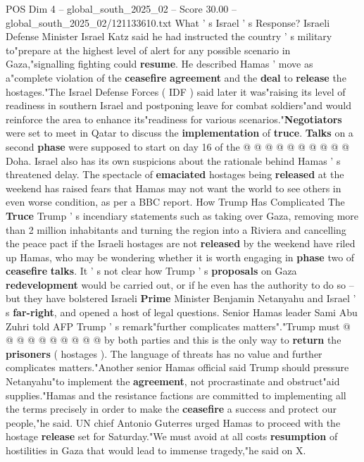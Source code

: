 \begin{textsample}{POS Dim 4 – global\_south\_2025\_02 – Score 30.00 – global\_south\_2025\_02/121133610.txt}
What ' s Israel ' s Response?
Israeli Defense Minister Israel Katz said he had instructed the country ' s military to"prepare at the highest level of alert for any possible scenario in Gaza,"signalling fighting could \textbf{resume}.
He described Hamas ' move as a"complete violation of the \textbf{ceasefire} \textbf{agreement} and the \textbf{deal} to \textbf{release} the hostages."The Israel Defense Forces ( IDF ) said later it was"raising its level of readiness in southern Israel and postponing leave for combat soldiers"and would reinforce the area to enhance its"readiness for various scenarios."\textbf{Negotiators} were set to meet in Qatar to discuss the \textbf{implementation} of \textbf{truce}. \textbf{Talks} on a second \textbf{phase} were supposed to start on day 16 of the @ @ @ @ @ @ @ @ @ @ Doha.
Israel also has its own suspicions about the rationale behind Hamas ' s threatened delay.
The spectacle of \textbf{emaciated} hostages being \textbf{released} at the weekend has raised fears that Hamas may not want the world to see others in even worse condition, as per a BBC report.
How Trump Has Complicated The \textbf{Truce} Trump ' s incendiary statements such as taking over Gaza, removing more than 2 million inhabitants and turning the region into a Riviera and cancelling the peace pact if the Israeli hostages are not \textbf{released} by the weekend have riled up Hamas, who may be wondering whether it is worth engaging in \textbf{phase} two of \textbf{ceasefire} \textbf{talks}.
It ' s not clear how Trump ' s \textbf{proposals} on Gaza \textbf{redevelopment} would be carried out, or if he even has the authority to do so -- but they have bolstered Israeli \textbf{Prime} Minister Benjamin Netanyahu and Israel ' s \textbf{far-right}, and opened a host of legal questions.
Senior Hamas leader Sami Abu Zuhri told AFP Trump ' s remark"further complicates matters"."Trump must @ @ @ @ @ @ @ @ @ @ by both parties and this is the only way to \textbf{return} the \textbf{prisoners} ( hostages ).
The language of threats has no value and further complicates matters."Another senior Hamas official said Trump should pressure Netanyahu"to implement the \textbf{agreement}, not procrastinate and obstruct"aid supplies."Hamas and the resistance factions are committed to implementing all the terms precisely in order to make the \textbf{ceasefire} a success and protect our people,"he said.
UN chief Antonio Guterres urged Hamas to proceed with the hostage \textbf{release} set for Saturday."We must avoid at all costs \textbf{resumption} of hostilities in Gaza that would lead to immense tragedy,"he said on X.

\end{textsample}
